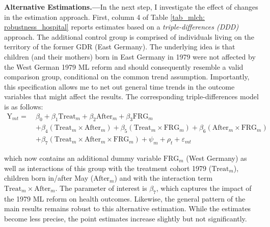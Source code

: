 \textbf{Alternative Estimations.---}In the next step, I investigate the effect of changes in the estimation approach. First, column 4 of Table \ref{tab_mlch: robustness_hospital} reports estimates based on a \textit{triple-differences (DDD)} approach. The additional control group is comprised of individuals living on the territory of the former GDR (East Germany). The underlying idea is that children (and their mothers) born in East Germany in 1979 were not affected by the West German 1979 ML reform and should consequently resemble a valid comparison group, conditional on the common trend assumption. Importantly, this specification allows me to net out general time trends in the outcome variables that might affect the results. The corresponding triple-differences model is as follows:
\begin{align}
\text{Y}_{mt} =\ &\beta_0 + \beta_1 \text{Treat}_{m} + \beta_2 \text{After}_{m} + \beta_3 \text{FRG}_m \nonumber\\&+ \beta_4 (\text{Treat}_{m} \times \text{After}_{m}) + \beta_5 (\text{Treat}_m \times \text{FRG}_m) + \beta_6 (\text{After}_m \times \text{FRG}_m) \nonumber\\ &+ \beta_7 (\text{Treat}_m\times \text{After}_m\times \text{FRG}_m) + \psi_m + \rho_t + \varepsilon_{mt} \label{eq_mlch:DDD}
\end{align}

which now contains an additional dummy variable $\text{FRG}_m$ (West Germany) as well as interactions of this group with the treatment cohort 1979 ($\text{Treat}_{m}$), children born in/after May ($\text{After}_{m}$) and with the interaction term $\text{Treat}_{m} \times \text{After}_{m}$. The parameter of interest is $\beta_7$, which captures the impact of the 1979 ML reform on health outcomes. Likewise, the general pattern of the main results remains robust to this alternative estimation. While the estimates become less precise, the point estimates increase slightly but not significantly.


